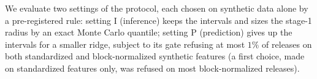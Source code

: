 %
%
%
%

We evaluate two settings of the protocol, each chosen on synthetic data alone by a pre-registered rule: setting I (inference) keeps the intervals and sizes the stage-1 radius by an exact Monte Carlo quantile; setting P (prediction) gives up the intervals for a smaller ridge, subject to its gate refusing at most $1\%$ of releases on both standardized and block-normalized synthetic features (a first choice, made on standardized features only, was refused on most block-normalized releases).

